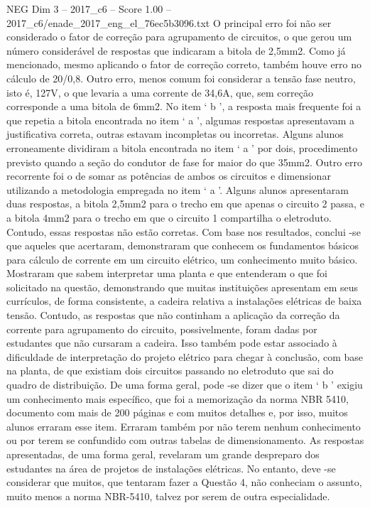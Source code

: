 \begin{textsample}{NEG Dim 3 – 2017\_c6 – Score 1.00 – 2017\_c6/enade\_2017\_eng\_el\_76ec5b3096.txt}
O principal erro foi não ser considerado o fator de correção para agrupamento de circuitos, o que gerou um número considerável de respostas que indicaram a bitola de 2,5mm2.
Como já mencionado, mesmo aplicando o fator de correção correto, também houve erro no cálculo de 20/0,8.
Outro erro, menos comum foi considerar a tensão fase neutro, isto é, 127V, o que levaria a uma corrente de 34,6A, que, sem correção corresponde a uma bitola de 6mm2.
No item ‘ b ’, a resposta mais frequente foi a que repetia a bitola encontrada no item ‘ a ’, algumas respostas apresentavam a justificativa correta, outras estavam incompletas ou incorretas.
Alguns alunos erroneamente dividiram a bitola encontrada no item ‘ a ’ por dois, procedimento previsto quando a seção do condutor de fase for maior do que 35mm2.
Outro erro recorrente foi o de somar as potências de ambos os circuitos e dimensionar utilizando a metodologia empregada no item ‘ a ’.
Alguns alunos apresentaram duas respostas, a bitola 2,5mm2 para o trecho em que apenas o circuito 2 passa, e a bitola 4mm2 para o trecho em que o circuito 1 compartilha o eletroduto.
Contudo, essas respostas não estão corretas.
Com base nos resultados, conclui -se que aqueles que acertaram, demonstraram que conhecem os fundamentos básicos para cálculo de corrente em um circuito elétrico, um conhecimento muito básico.
Mostraram que sabem interpretar uma planta e que entenderam o que foi solicitado na questão, demonstrando que muitas instituições apresentam em seus currículos, de forma consistente, a cadeira relativa a instalações elétricas de baixa tensão.
Contudo, as respostas que não continham a aplicação da correção da corrente para agrupamento do circuito, possivelmente, foram dadas por estudantes que não cursaram a cadeira.
Isso também pode estar associado à dificuldade de interpretação do projeto elétrico para chegar à conclusão, com base na planta, de que existiam dois circuitos passando no eletroduto que sai do quadro de distribuição.
De uma forma geral, pode -se dizer que o item ‘ b ’ exigiu um conhecimento mais específico, que foi a memorização da norma NBR 5410, documento com mais de 200 páginas e com muitos detalhes e, por isso, muitos alunos erraram esse item.
Erraram também por não terem nenhum conhecimento ou por terem se confundido com outras tabelas de dimensionamento.
As respostas apresentadas, de uma forma geral, revelaram um grande despreparo dos estudantes na área de projetos de instalações elétricas.
No entanto, deve -se considerar que muitos, que tentaram fazer a Questão 4, não conheciam o assunto, muito menos a norma NBR-5410, talvez por serem de outra especialidade.

\end{textsample}
